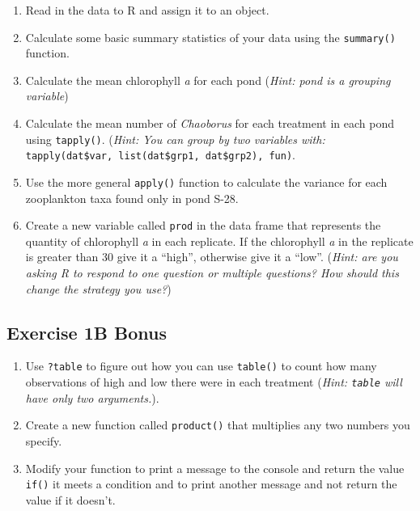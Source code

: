\documentclass[]{book}
\providecommand{\tightlist}{%
  \setlength{\itemsep}{0pt}\setlength{\parskip}{0pt}}
\begin{document}
\begin{enumerate}
\def\labelenumi{\arabic{enumi}.}
\tightlist
\item
  Read in the data to R and assign it to an object.
\item
  Calculate some basic summary statistics of your data using the \texttt{summary()} function.
\item
  Calculate the mean chlorophyll \emph{a} for each pond (\emph{Hint: pond is a grouping variable})
\item
  Calculate the mean number of \emph{Chaoborus} for each treatment in each pond using \texttt{tapply()}. (\emph{Hint: You can group by two variables with:} \texttt{tapply(dat\$var,\ list(dat\$grp1,\ dat\$grp2),\ fun)}.
\item
  Use the more general \texttt{apply()} function to calculate the variance for each zooplankton taxa found only in pond S-28.
\item
  Create a new variable called \texttt{prod} in the data frame that represents the quantity of chlorophyll \emph{a} in each replicate. If the chlorophyll \emph{a} in the replicate is greater than 30 give it a ``high'', otherwise give it a ``low''. (\emph{Hint: are you asking R to respond to one question or multiple questions? How should this change the strategy you use?})
\end{enumerate}

\hypertarget{exercise-1b-bonus}{%
\subsection*{Exercise 1B Bonus}\label{exercise-1b-bonus}}

\begin{enumerate}
\def\labelenumi{\arabic{enumi}.}
\tightlist
\item
  Use \texttt{?table} to figure out how you can use \texttt{table()} to count how many observations of high and low there were in each treatment (\emph{Hint: \texttt{table} will have only two arguments.}).
\item
  Create a new function called \texttt{product()} that multiplies any two numbers you specify.
\item
  Modify your function to print a message to the console and return the value \texttt{if()} it meets a condition and to print another message and not return the value if it doesn't.
\end{enumerate}
\end{document}
